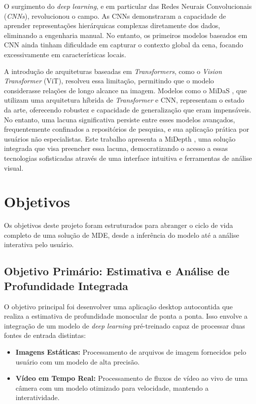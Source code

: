 \documentclass{SBCbookchapter}
\newcommand{\nomeProjeto}{MiDepth }
\begin{document}
    O surgimento do \textit{deep learning}, e em particular das Redes Neurais Convolucionais
    (\textit{CNNs}), revolucionou o campo. As CNNs demonstraram a capacidade de
    aprender representações hierárquicas complexas diretamente dos dados, eliminando
    a engenharia manual. No entanto, os primeiros modelos baseados em CNN ainda
    tinham dificuldade em capturar o contexto global da cena, focando excessivamente
    em características locais.

    A introdução de arquiteturas baseadas em \textit{Transformers}, como o \textit{Vision
    Transformer} (ViT), resolveu essa limitação, permitindo que o modelo considerasse
    relações de longo alcance na imagem. Modelos como o MiDaS \cite{ranftl2022},
    que utilizam uma arquitetura híbrida de \textit{Transformer} e CNN, representam
    o estado da arte, oferecendo robustez e capacidade de generalização que eram
    impensáveis. No entanto, uma lacuna significativa persiste entre esses modelos
    avançados, frequentemente confinados a repositórios de pesquisa, e sua aplicação
    prática por usuários não especialistas. Este trabalho apresenta a \nomeProjeto,
    uma solução integrada que visa preencher essa lacuna, democratizando o acesso
    a essas tecnologias sofisticadas através de uma interface intuitiva e ferramentas
    de análise visual.

    \section{Objetivos}
    Os objetivos deste projeto foram estruturados para abranger o ciclo de vida
    completo de uma solução de MDE, desde a inferência do modelo até a análise
    interativa pelo usuário.

    \subsection{Objetivo Primário: Estimativa e Análise de Profundidade Integrada}
    O objetivo principal foi desenvolver uma aplicação desktop autocontida que
    realiza a estimativa de profundidade monocular de ponta a ponta. Isso envolve
    a integração de um modelo de \textit{deep learning} pré-treinado capaz de processar
    duas fontes de entrada distintas:
    \begin{itemize}
        \item \textbf{Imagens Estáticas:} Processamento de arquivos de imagem fornecidos
        pelo usuário com um modelo de alta precisão.
        \item \textbf{Vídeo em Tempo Real:} Processamento de fluxos de vídeo ao vivo
        de uma câmera com um modelo otimizado para velocidade, mantendo a interatividade.
    \end{itemize}
\end{document}
